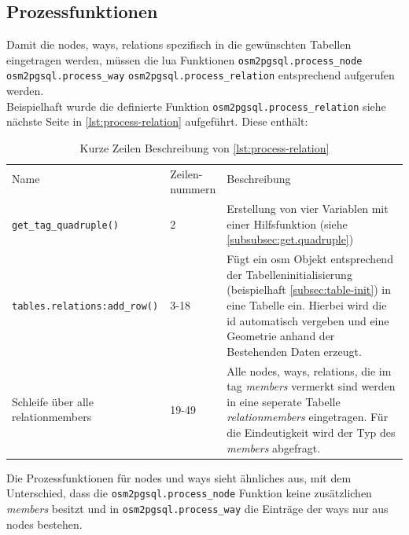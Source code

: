 \subsection{Prozessfunktionen}
Damit die nodes, ways, relations spezifisch in die gewünschten Tabellen eingetragen werden, müssen die lua Funktionen \lstinline|osm2pgsql.process_node| \lstinline|osm2pgsql.process_way| \lstinline|osm2pgsql.process_relation| entsprechend aufgerufen werden. \\
Beispielhaft wurde die definierte Funktion \lstinline|osm2pgsql.process_relation| siehe nächste Seite in \autoref{lst:process-relation} aufgeführt.
Diese enthält:
\begin{table}[h]
	\caption{Kurze Zeilen Beschreibung von \autoref{lst:process-relation}}
	\renewcommand{\arraystretch}{1.5}
	\begin{tabularx}{\linewidth}{|l|l|X|}\hline
		Name & \multirow{2}{*}{\parbox{1.6cm}{Zeilen-\\ nummern}} & Beschreibung\\
		&& \\\hline
		\lstinline|get_tag_quadruple()| & 2 & Erstellung von vier Variablen mit einer Hilfsfunktion (siehe \autoref{subsubsec:get.quadruple})\\\hline
		\lstinline|tables.relations:add_row()| & 3-18 & Fügt ein osm Objekt entsprechend der Tabelleninitialisierung (beispielhaft \autoref{subsec:table-init}) in eine Tabelle ein. \newline Hierbei wird die id automatisch vergeben und eine Geometrie anhand der Bestehenden Daten erzeugt.\\\hline
		Schleife über alle relationmembers & 19-49 & Alle nodes, ways, relations, die im tag \textit{members} vermerkt sind werden in eine seperate Tabelle \textit{relationmembers} eingetragen. Für die Eindeutigkeit wird der Typ des \textit{members} abgefragt. \\\hline
	\end{tabularx}
\end{table}

Die Prozessfunktionen für nodes und ways sieht ähnliches aus, mit dem Unterschied, dass die \lstinline|osm2pgsql.process_node| Funktion keine zusätzlichen \textit{members} besitzt und in \lstinline|osm2pgsql.process_way| die Einträge der ways nur aus nodes bestehen.

